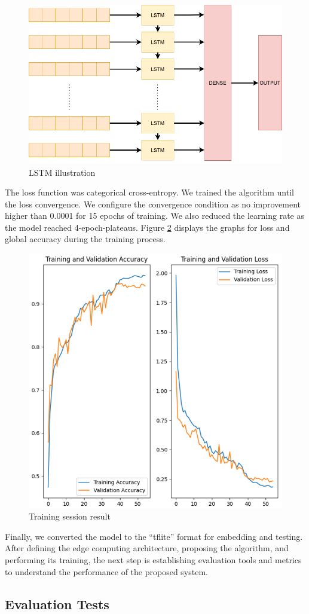 \begin{figure}[h!]
    \centering
    \includegraphics[width=.7\linewidth]{Figures/lstm.png}
    \caption{LSTM illustration}
    \label{fig:lstm}
\end{figure}

The loss function was categorical cross-entropy. We trained the algorithm until the loss convergence. We configure the convergence condition as no improvement higher than 0.0001 for 15 epochs of training. We also reduced the learning rate as the model reached 4-epoch-plateaus. Figure \ref{fig:training} displays the graphs for loss and global accuracy during the training process.

\begin{figure}[h!]
    \centering
    \includegraphics[width=.5\linewidth]{Figures/training.png}
    \caption{Training session result}
    \label{fig:training}
\end{figure}

Finally, we converted the model to the ``tflite'' format for embedding and testing. After defining the edge computing architecture, proposing the algorithm, and performing its training, the next step is establishing evaluation tools and metrics to understand the performance of the proposed system.

\subsection{Evaluation Tests}

